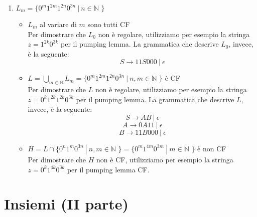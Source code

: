 \documentclass[a4paper,oneside,titlepage]{book}
\begin{document}
\begin{enumerate}[label=\fbox{\arabic*}]
\begin{itemize}
\begin{center}
\end{center}
\end{itemize}

\item $L_m = \text{\{ } 0^m 1^{2m} 1^{2n} 0^{3n} \ | \  n \in \mathbb{N} \text{ \}}$
\begin{itemize}
\item $L_m$ al variare di $m$ sono tutti CF
\\ Per dimostrare che $L_0$ non è regolare, utilizziamo per esempio la stringa $z = 1^{2k} 0^{3k}$ per il pumping lemma. La grammatica che descrive $L_0$, invece, è la seguente:
\[ S \longrightarrow 11S000 \ | \ \epsilon \]

\newpage
\item $L = \bigcup_{m \in \mathbb{N}} L_m = \text{\{ } 0^m 1^{2m} 1^{2n} 0^{3n} \ | \  n,m \in \mathbb{N} \text{ \}}$ è CF
\\ Per dimostrare che $L$ non è regolare, utilizziamo per esempio la stringa $z = 0^k 1^{2k} 1^{2k} 0^{3k}$ per il pumping lemma. La grammatica che descrive $L$, invece, è la seguente:
\[ S \longrightarrow AB \ | \ \epsilon \]
\[ A \longrightarrow 0A11 \ | \ \epsilon \]
\[ B \longrightarrow 11B000 \ | \ \epsilon \]

\item $H = L \cap \text{\{ } 0^n 1^m 0^{3n} \ | \  n,m \in \mathbb{N} \text{ \}} = \text{\{ } 0^m 1^{4m} 0^{3m} \ | \  m \in \mathbb{N} \text{ \}}$ è non CF
\\ Per dimostrare che $H$ non è CF, utilizziamo per esempio la stringa $z = 0^k 1^{4k} 0^{3k}$ per il pumping lemma CF.
\end{itemize}
\end{enumerate}


\chapter{Insiemi (II parte)}
\end{document}
